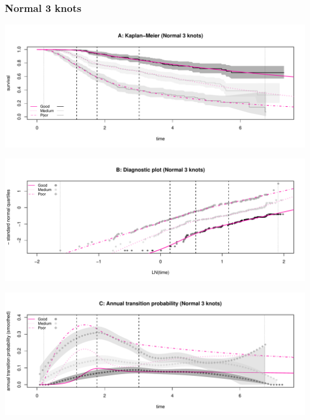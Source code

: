 \documentclass[
]{article}
\begin{document}
\clearpage

\subsubsection{Normal 3 knots}\label{normal-3-knots}

\begin{flushleft}\includegraphics[height=0.25\textheight]{BC_OS_output/Images/Figure_spline_models-25} \end{flushleft}

\begin{flushleft}\includegraphics[height=0.25\textheight]{BC_OS_output/Images/Figure_spline_models-26} \end{flushleft}

\begin{flushleft}\includegraphics[height=0.25\textheight]{BC_OS_output/Images/Figure_spline_models-27} \end{flushleft}
\end{document}
